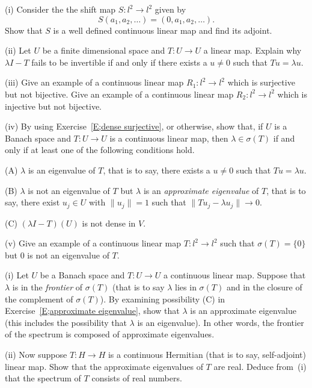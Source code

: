 \begin{exercise}\label{C4.5}\label{E;approximate eigenvalue} 
(i) Consider the the shift map $S:l^{2}\rightarrow l^{2}$
given by
\[S(a_{1},a_{2},\dots)=(0,a_{1},a_{2},\dots).\] 
Show that $S$ is a well defined continuous linear map
and find its adjoint.

(ii) Let $U$ be a finite dimensional space and $T:U\rightarrow U$
a linear map. Explain why $\lambda I -T$ fails to be invertible
if and only if there exists a $u\neq 0$ such that $Tu=\lambda u$.

(iii) Give an example of a 
continuous linear map $R_{1}:l^{2}\rightarrow l^{2}$
which is surjective but not bijective.
Give an example of a 
continuous linear map $R_{2}:l^{2}\rightarrow l^{2}$
which is injective but not bijective.

(iv) By using Exercise~\ref{E;dense surjective}, or otherwise, show that,
if $U$ is a Banach space and $T:U\rightarrow U$
is a continuous linear map, then $\lambda\in\sigma(T)$ if and only if
at least one of the  following conditions hold.

(A) $\lambda$ is an eigenvalue of $T$, that is to say, there exists
a $u\neq 0$ such that $Tu=\lambda u$.

(B) $\lambda$ is not an eigenvalue of $T$ but
$\lambda$ is an \emph{approximate eigenvalue} of $T$,
that is to say, there exist
$u_{j}\in U$ with $\|u_{j}\|=1$ such that 
$\|Tu_{j}-\lambda u_{j}\|\rightarrow 0$.

(C) $(\lambda I-T)(U)$ is not dense in $V$.

(v) Give an example of a continuous linear map
$T:l^{2}\rightarrow l^{2}$ such that $\sigma(T)=\{0\}$ but $0$
is not an eigenvalue of $T$.
 
\end{exercise}
\begin{exercise}\label{C4.6} 
(i) Let  $U$ be a Banach space and $T:U\rightarrow U$
a continuous linear map.
Suppose that $\lambda$ is in the \emph{frontier}
of $\sigma(T)$ (that is to say $\lambda$ lies in $\sigma(T)$
and in the closure of the complement of  $\sigma(T)$). By
examining possibility (C) in Exercise~\ref{E;approximate eigenvalue},
show that $\lambda$ is an approximate eigenvalue
(this includes the possibility that $\lambda$ is an eigenvalue).
In other words, the frontier of the spectrum is composed
of approximate eigenvalues. 

(ii) Now suppose $T:H\rightarrow H$ is a continuous
Hermitian (that is to say, self-adjoint) linear map.
Show that the approximate eigenvalues of $T$ are real.
Deduce from~(i) that the spectrum of $T$ consists of
real numbers.
\end{exercise}
